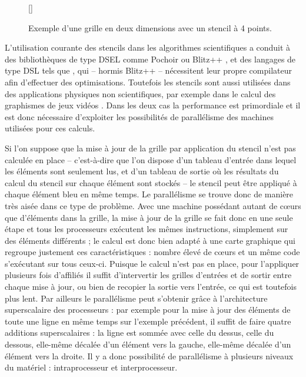 \begin{figure}[!h]
[\FBwidth]
{\caption{Exemple d'une grille en deux dimensions avec un stencil à 4 points.}\label{fig:stencil_base}}
{}
\end{figure}

L'utilisation courante des stencils dans les algorithmes scientifiques a conduit à des bibliothèques de type DSEL comme \textsf{Pochoir} \cite{Art18} ou  \textsf{Blitz++} \cite{Art5}, et des langages de type DSL tels que \cite{Art19}, qui -- hormis \textsf{Blitz++} -- nécessitent leur propre compilateur afin d'effectuer des optimisations. Toutefois les stencils sont aussi utilisées dans des applications physiques non scientifiques, par exemple dans le calcul des graphismes de jeux vidéos \cite{Art15}. Dans les deux cas la performance est primordiale et il est donc nécessaire d'exploiter les possibilités de parallélisme des machines utilisées pour ces calculs.  

Si l'on suppose que la mise à jour de la grille par application du stencil n'est pas calculée en place -- c'est-à-dire que l'on dispose d'un tableau d'entrée dans lequel les éléments sont seulement lus, et d'un tableau de sortie où les résultats du calcul du stencil sur chaque élément sont stockés -- le stencil peut être appliqué à chaque élément bleu en même temps. Le parallélisme se trouve donc de manière très aisée dans ce type de problème. Avec une  machine possédant autant de cœurs que d'éléments dans la grille, la mise à jour de la grille se fait donc en une seule étape et tous les processeurs exécutent les mêmes instructions, simplement sur des éléments différents ; le calcul est donc bien adapté à une carte graphique qui regroupe justement ces caractéristiques : nombre élevé de cœurs et un même code s'exécutant sur tous ceux-ci. Puisque le calcul n'est pas en place, pour l'appliquer plusieurs fois d'affiliés il suffit d'intervertir les grilles d'entrées et de sortir entre chaque mise à jour, ou bien de recopier la sortie vers l'entrée, ce qui est toutefois plus lent. Par ailleurs le parallélisme peut s'obtenir grâce à l'architecture superscalaire des processeurs : par exemple pour la mise à jour des éléments de toute une ligne en même temps sur l'exemple précédent, il suffit de faire quatre additions superscalaires : la ligne est sommée avec celle du dessus, celle du dessous, elle-même décalée d'un élément vers la gauche, elle-même décalée d'un élément vers la droite. Il y a donc possibilité de parallélisme à plusieurs niveaux du matériel : intraprocesseur et interprocesseur. 

